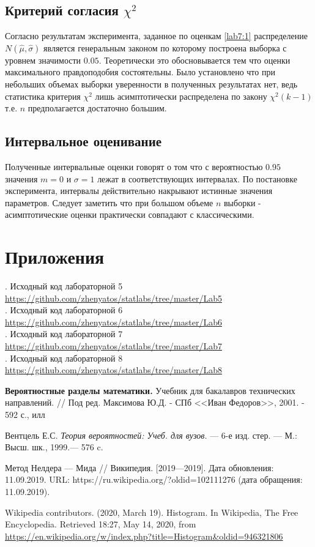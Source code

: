 \documentclass[12pt,a4paper]{article}
\begin{document}
\subsection{Критерий согласия $\chi^2$}
Согласно результатам эксперимента, заданное по оценкам \eqref{lab7:1} распределение $N(\widehat{\mu}, \widehat{\sigma})$ является генеральным законом по которому построена выборка с уровнем значимости $0.05$. Теоретически это обосновывается тем что оценки максимального правдоподобия состоятельны. Было установлено что при небольших объемах выборки уверенности в полученных результатах нет, ведь статистика критерия $\chi^2$ лишь асимптотически распределена по закону $\chi^2 (k-1)$ т.е. $n$ предполагается достаточно большим.

\subsection{Интервальное оценивание}
Полученные интервальные оценки говорят о том что с вероятностью $0.95$ значения $m = 0$ и $\sigma = 1$ лежат в соответствующих интервалах. По постановке эксперимента, интервалы действительно накрывают истинные значения параметров. Следует заметить что при большом объеме $n$ выборки - асимптотические оценки практически совпадают с классическими.
\pagebreak

\section{Приложения}\label{sec:appl}
. Исходный код лабораторной 5 {\url{https://github.com/zhenyatos/statlabs/tree/master/Lab5}} \\
. Исходный код лабораторной 6 {\url{https://github.com/zhenyatos/statlabs/tree/master/Lab6}} \\
. Исходный код лабораторной 7 {\url{https://github.com/zhenyatos/statlabs/tree/master/Lab7}} \\
. Исходный код лабораторной 8 {\url{https://github.com/zhenyatos/statlabs/tree/master/Lab8}}

\begin{thebibliography}{9} 
	 \textbf{Вероятностные разделы математики.} Учебник для бакалавров технических направлений. // Под ред. Максимова Ю.Д. - СПб <<Иван Федоров>>, 2001. - 592 с., илл
	
	 Вентцель Е.С. \textit{Теория вероятностей: Учеб. для вузов.} — 6-е изд. стер. — М.: Высш. шк., 1999.— 576 c.
	
	 Метод Нелдера — Мида // Википедия. [2019—2019]. Дата обновления: 11.09.2019. URL: https://ru.wikipedia.org/?oldid=102111276 (дата обращения: 11.09.2019).
	
	 Wikipedia contributors. (2020, March 19). Histogram. In Wikipedia, The Free Encyclopedia. Retrieved 18:27, May 14, 2020, from \url{https://en.wikipedia.org/w/index.php?title=Histogram&oldid=946321806}
\end{thebibliography}
\end{document}
